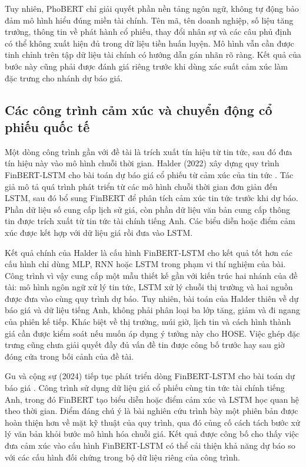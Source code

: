 Tuy nhiên, PhoBERT chỉ giải quyết phần nền tảng ngôn ngữ, không tự động bảo đảm mô
hình hiểu đúng miền tài chính. Tên mã, tên doanh nghiệp, số liệu tăng trưởng, thông
tin về phát hành cổ phiếu, thay đổi nhân sự và các câu phủ định có thể không xuất hiện
đủ trong dữ liệu tiền huấn luyện. Mô hình vẫn cần được tinh chỉnh trên tập dữ liệu tài
chính có hướng dẫn gán nhãn rõ ràng. Kết quả của bước này cũng phải được đánh giá riêng
trước khi dùng xác suất cảm xúc làm đặc trưng cho nhánh dự báo giá.

\subsection{Các công trình cảm xúc và chuyển động cổ phiếu quốc tế}

Một dòng công trình gần với đề tài là trích xuất tín hiệu từ tin tức, sau đó đưa tín
hiệu này vào mô hình chuỗi thời gian. Halder (2022) xây dựng quy trình FinBERT-LSTM
cho bài toán dự báo giá cổ phiếu từ cảm xúc của tin tức
\cite{Halder2022_221107392v1}. Tác giả mô tả quá trình phát triển từ các mô hình chuỗi
thời gian đơn giản đến LSTM, sau đó bổ sung FinBERT để phân tích cảm xúc tin tức trước
khi dự báo. Phần dữ liệu số cung cấp lịch sử giá, còn phần dữ liệu văn bản cung cấp
thông tin được trích xuất từ tin tức tài chính tiếng Anh. Các biểu diễn hoặc điểm
cảm xúc được kết hợp với dữ liệu giá rồi đưa vào LSTM.

Kết quả chính của Halder là cấu hình FinBERT-LSTM cho kết quả tốt hơn các cấu hình
chỉ dùng MLP, RNN hoặc LSTM trong phạm vi thí nghiệm của bài. Công trình vì vậy cung
cấp một mẫu thiết kế gần với kiến trúc hai nhánh của đề tài: mô hình ngôn ngữ xử lý
tin tức, LSTM xử lý chuỗi thị trường và hai nguồn được đưa vào cùng quy trình dự báo.
Tuy nhiên, bài toán của Halder thiên về dự báo giá và dữ liệu tiếng Anh, không phải
phân loại ba lớp tăng, giảm và đi ngang của phiên kế tiếp. Khác biệt về thị trường,
múi giờ, lịch tin và cách hình thành giá cần được kiểm soát nếu muốn áp dụng ý tưởng
này cho HOSE. Việc ghép đặc trưng cũng chưa giải quyết đầy đủ vấn đề tin được công bố
trước hay sau giờ đóng cửa trong bối cảnh của đề tài.

Gu và cộng sự (2024) tiếp tục phát triển dòng FinBERT-LSTM cho bài toán dự báo giá
\cite{Gu2024_240716150v1}. Công trình sử dụng dữ liệu giá cổ phiếu cùng tin tức tài
chính tiếng Anh, trong đó FinBERT tạo biểu diễn hoặc điểm cảm xúc và LSTM học quan hệ
theo thời gian. Điểm đáng chú ý là bài nghiên cứu trình bày một phiên bản được hoàn
thiện hơn về mặt kỹ thuật của quy trình, qua đó củng cố cách tách bước xử lý văn bản
khỏi bước mô hình hóa chuỗi giá. Kết quả được công bố cho thấy việc đưa cảm xúc
vào cấu hình FinBERT-LSTM có thể cải thiện khả năng dự báo so với các cấu hình đối
chứng trong bộ dữ liệu riêng của công trình.

